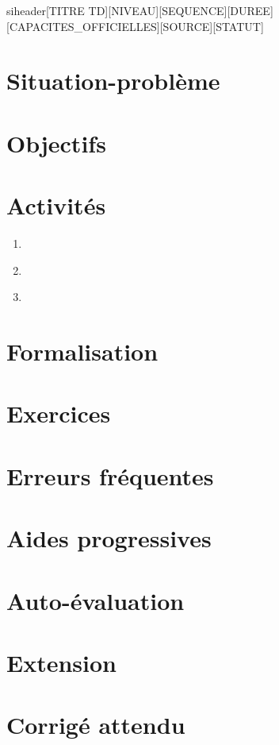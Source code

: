 \documentclass[a4paper,11pt]{article}
\begin{document}
siheader{[TITRE TD]}{[NIVEAU]}{[SEQUENCE]}{[DUREE]}{[CAPACITES\_OFFICIELLES]}{[SOURCE]}{[STATUT]}
\section*{Situation-problème}
\section*{Objectifs}
\section*{Activités}
\begin{enumerate}[nosep]
  \item ~
  \item ~
  \item ~
\end{enumerate}
\section*{Formalisation}
\section*{Exercices}
\section*{Erreurs fréquentes}
\section*{Aides progressives}
\section*{Auto-évaluation}
\section*{Extension}
\section*{Corrigé attendu}
\end{document}
